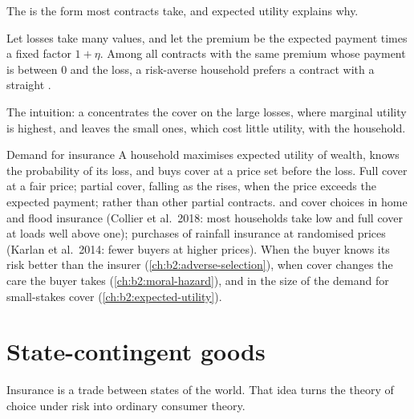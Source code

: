 The  is the form most contracts take, and expected utility explains why.

\begin{proposition}\label{prop:b2:insurance-and-risk-sharing:arrow}
Let losses take many values, and let the premium be the expected payment times a fixed factor $1 +
\eta$. Among all contracts with the same premium whose payment is between $0$ and the loss, a
risk-averse household prefers a contract with a straight .
\end{proposition}
\admitted

The intuition: a  concentrates the cover on the large losses, where marginal utility is
highest, and leaves the small ones, which cost little utility, with the household.

\begin{model}{Demand for insurance}
\assumes A household maximises expected utility of wealth, knows the probability of its loss, and
buys cover at a price set before the loss.
\predicts Full cover at a fair price; partial cover, falling as the  rises, when the price
exceeds the expected payment;  rather than other partial contracts.
\tested {} and cover choices in home and flood insurance (Collier et al.\ 2018: most households
take low  and full cover at loads well above one); purchases of rainfall insurance at
randomised prices (Karlan et al.\ 2014: fewer buyers at higher prices).
\breaks When the buyer knows its risk better than the insurer (\cref{ch:b2:adverse-selection}), when
cover changes the care the buyer takes (\cref{ch:b2:moral-hazard}), and in the size of the demand for
small-stakes cover (\cref{ch:b2:expected-utility}).
\end{model}

\section{State-contingent goods}\label{sec:b2:insurance-and-risk-sharing:contingent}

Insurance is a trade between states of the world. That idea turns the theory of choice under risk into
ordinary consumer theory.

